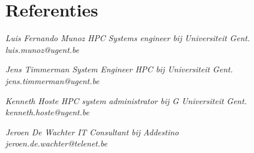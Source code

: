 \documentclass[margin, 10pt]{res} %
\begin{document}
\section{Referenties}
{\sl Luis Fernando Munoz \hfill HPC Systems engineer bij Universiteit Gent. \\
luis.munoz@ugent.be
}

{\sl Jens Timmerman \hfill System Engineer HPC bij Universiteit Gent. \\
jens.timmerman@ugent.be
}

{\sl Kenneth Hoste \hfill HPC system administrator bij G Universiteit Gent. \\
kenneth.hoste@ugent.be
}

{\sl Jeroen De Wachter \hfill IT Consultant bij Addestino  \\
jeroen.de.wachter@telenet.be
}
\end{document}

